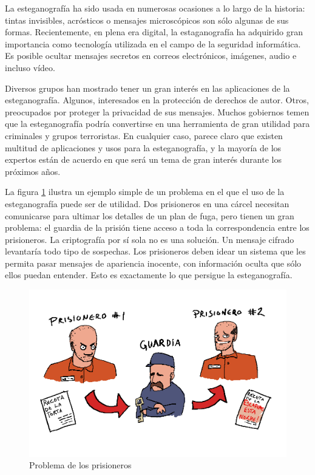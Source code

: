 \documentclass[12pt]{article}
\begin{document}
La esteganografía ha sido usada en numerosas ocasiones a lo largo de la historia: tintas invisibles, acrósticos o mensajes microscópicos son sólo algunas de sus formas. Recientemente, en plena era digital, la estaganografía ha adquirido gran importancia como tecnología utilizada en el campo de la seguridad informática. Es posible ocultar mensajes secretos en correos electrónicos, imágenes, audio e incluso vídeo.

Diversos grupos han mostrado tener un gran interés en las aplicaciones de la esteganografía. Algunos, interesados en la protección de derechos de autor. Otros, preocupados por proteger la privacidad de sus mensajes. Muchos gobiernos temen que la esteganografía podría convertirse en una herramienta de gran utilidad para criminales y grupos terroristas. En cualquier caso, parece claro que existen multitud de aplicaciones y usos para la esteganografía, y la mayoría de los expertos están de acuerdo en que será un tema de gran interés durante los próximos años.

La figura \ref{prisioneros} ilustra un ejemplo simple de un problema en el que el uso de la esteganografía puede ser de utilidad.
Dos prisioneros en una cárcel necesitan comunicarse para ultimar los detalles de un plan de fuga, pero tienen un gran problema: el guardia de la prisión tiene acceso a toda la correspondencia entre los prisioneros. La criptografía por sí sola no es una solución. Un mensaje cifrado levantaría todo tipo de sospechas. Los prisioneros deben idear un sistema que les permita pasar mensajes de apariencia inocente, con información oculta que sólo ellos puedan entender. Esto es exactamente lo que persigue la esteganografía.

\begin{figure}[h]
  \centering
    \includegraphics[width=\textwidth]{img/illustration2}
  \caption{Problema de los prisioneros}
  \label{prisioneros}
\end{figure}
\end{document}
